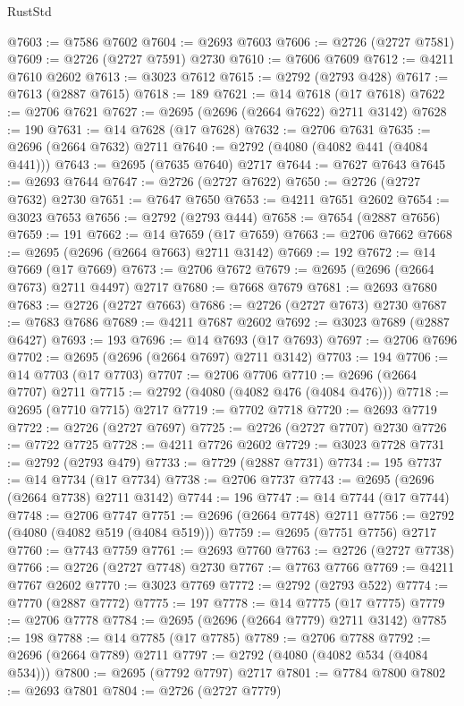 \begin{lexlean}{RustStd}
\begin{coremodule}
@7603 := @7586 @7602
@7604 := @2693 @7603
@7606 := @2726 (@2727 @7581)
@7609 := @2726 (@2727 @7591) @2730
@7610 := @7606 @7609
@7612 := @4211 @7610 @2602
@7613 := @3023 @7612
@7615 := @2792 (@2793 @428)
@7617 := @7613 (@2887 @7615)
@7618 := 189
@7621 := @14 @7618 (@17 @7618)
@7622 := @2706 @7621
@7627 := @2695 (@2696 (@2664 @7622) @2711 @3142)
@7628 := 190
@7631 := @14 @7628 (@17 @7628)
@7632 := @2706 @7631
@7635 := @2696 (@2664 @7632) @2711
@7640 := @2792 (@4080 (@4082 @441 (@4084 @441)))
@7643 := @2695 (@7635 @7640) @2717
@7644 := @7627 @7643
@7645 := @2693 @7644
@7647 := @2726 (@2727 @7622)
@7650 := @2726 (@2727 @7632) @2730
@7651 := @7647 @7650
@7653 := @4211 @7651 @2602
@7654 := @3023 @7653
@7656 := @2792 (@2793 @444)
@7658 := @7654 (@2887 @7656)
@7659 := 191
@7662 := @14 @7659 (@17 @7659)
@7663 := @2706 @7662
@7668 := @2695 (@2696 (@2664 @7663) @2711 @3142)
@7669 := 192
@7672 := @14 @7669 (@17 @7669)
@7673 := @2706 @7672
@7679 := @2695 (@2696 (@2664 @7673) @2711 @4497) @2717
@7680 := @7668 @7679
@7681 := @2693 @7680
@7683 := @2726 (@2727 @7663)
@7686 := @2726 (@2727 @7673) @2730
@7687 := @7683 @7686
@7689 := @4211 @7687 @2602
@7692 := @3023 @7689 (@2887 @6427)
@7693 := 193
@7696 := @14 @7693 (@17 @7693)
@7697 := @2706 @7696
@7702 := @2695 (@2696 (@2664 @7697) @2711 @3142)
@7703 := 194
@7706 := @14 @7703 (@17 @7703)
@7707 := @2706 @7706
@7710 := @2696 (@2664 @7707) @2711
@7715 := @2792 (@4080 (@4082 @476 (@4084 @476)))
@7718 := @2695 (@7710 @7715) @2717
@7719 := @7702 @7718
@7720 := @2693 @7719
@7722 := @2726 (@2727 @7697)
@7725 := @2726 (@2727 @7707) @2730
@7726 := @7722 @7725
@7728 := @4211 @7726 @2602
@7729 := @3023 @7728
@7731 := @2792 (@2793 @479)
@7733 := @7729 (@2887 @7731)
@7734 := 195
@7737 := @14 @7734 (@17 @7734)
@7738 := @2706 @7737
@7743 := @2695 (@2696 (@2664 @7738) @2711 @3142)
@7744 := 196
@7747 := @14 @7744 (@17 @7744)
@7748 := @2706 @7747
@7751 := @2696 (@2664 @7748) @2711
@7756 := @2792 (@4080 (@4082 @519 (@4084 @519)))
@7759 := @2695 (@7751 @7756) @2717
@7760 := @7743 @7759
@7761 := @2693 @7760
@7763 := @2726 (@2727 @7738)
@7766 := @2726 (@2727 @7748) @2730
@7767 := @7763 @7766
@7769 := @4211 @7767 @2602
@7770 := @3023 @7769
@7772 := @2792 (@2793 @522)
@7774 := @7770 (@2887 @7772)
@7775 := 197
@7778 := @14 @7775 (@17 @7775)
@7779 := @2706 @7778
@7784 := @2695 (@2696 (@2664 @7779) @2711 @3142)
@7785 := 198
@7788 := @14 @7785 (@17 @7785)
@7789 := @2706 @7788
@7792 := @2696 (@2664 @7789) @2711
@7797 := @2792 (@4080 (@4082 @534 (@4084 @534)))
@7800 := @2695 (@7792 @7797) @2717
@7801 := @7784 @7800
@7802 := @2693 @7801
@7804 := @2726 (@2727 @7779)

\end{coremodule}
\end{lexlean}
